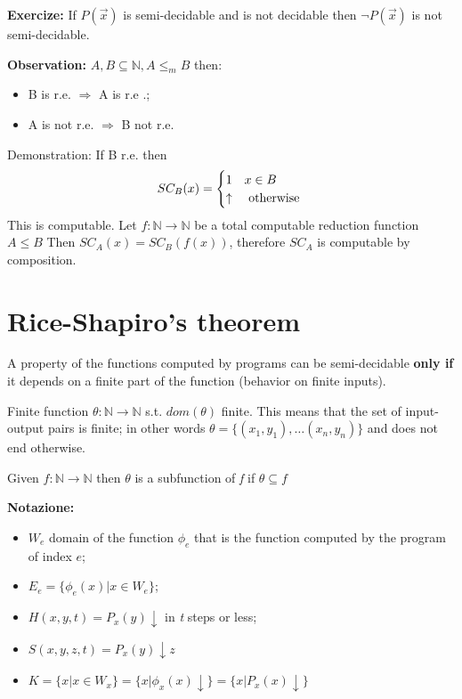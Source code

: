 \documentclass{amsbook}
\newcommand{\nat}{\ensuremath{\mathbb{N}}}
\theoremstyle{definition}
\theoremstyle{remark}
\numberwithin{section}{chapter}
\numberwithin{equation}{chapter}
\begin{document}
\textbf{Exercize:} If $ P(\vec{x}) $ is semi-decidable and is not decidable then $ \lnot P(\vec{x}) $ is not semi-decidable.

\textbf{Observation:} $ A,B \subseteq \nat, A\leq_m B $ then:
\begin{itemize}
	\item B is r.e. $ \Rightarrow $ A is r.e .;
	\item A is not r.e. $ \Rightarrow $ B not r.e.
\end{itemize}
Demonstration: If B r.e. then
\begin{equation*}
	SC_B(x) = \begin{cases}
		1        & x \in B       \\
		\uparrow & $ otherwise $
	\end{cases}
\end{equation*}
This is computable. Let $ f:\nat\rightarrow\nat $ be a total computable reduction function\\  $ A\leq B $ Then $ SC_A(x) = SC_B(f(x)) $, therefore $ SC_A $ is computable by composition.

\chapter {Rice-Shapiro's theorem}
A property of the functions computed by programs can be semi-decidable \textbf{only if} it depends on a finite part of the function (behavior on finite inputs).

Finite function $ \theta: \nat\rightarrow\nat $ s.t. $ dom(\theta) $ finite. This means that the set of input-output pairs is finite; in other words $ \theta = \{(x_1,y_1),\dots(x_n,y_n) \} $ and does not end otherwise.

Given $ f:\nat\rightarrow\nat $ then $ \theta  $ is a subfunction of \textit{f} if $ \theta \subseteq f $

\textbf{Notazione:}
\begin{itemize}
\item $ W_e $ domain of the function $ \phi_e $ that is the function computed by the program of index $e$;
\item $ E_e = \{\phi_e(x)|x\in W_e \}$;
\item $ H(x,y,t) = P_x(y)\downarrow $ in \textit{t} steps or less;
\item $ S(x,y,z,t) = P_x(y)\downarrow z $
\item $ K = \{x|x\in W_x \} = \{x|\phi_x(x)\downarrow \} = \{x|P_x(x)\downarrow \}$
\end{itemize}
\end{document}

